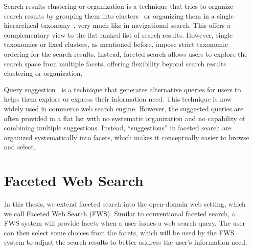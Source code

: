 Search results clustering or organization is a technique that tries to organize search results by grouping them into clusters~\cite{carpineto2009survey} or organizing them in a single hierarchical taxonomy~\cite{lawrie2001finding,lawrie2003generating, nevill1999lexically}, very much like in navigational search. This offers a complementary view to the flat ranked list of search results. However, single taxonomies or fixed clusters, as mentioned before, impose strict taxonomic ordering for the search results. Instead, faceted search allows users to explore the search space from multiple facets, offering flexibility beyond search results clustering or organization.

Query suggestion~\cite{baeza2004query, cao2008context} is a technique that generates alternative queries for users to helps them explore or express their information need. This technique is now widely used in commerce web search engine. However, the suggested queries are often provided in a flat list with no systematic organization and no capability of combining multiple suggestions. Instead, ``suggestions'' in faceted search are organized systematically into facets, which makes it conceptually easier to browse and select.

\section{Faceted Web Search}
\label{sec:intro-fws}
In this thesis, we extend faceted search into the open-domain web setting, which we call Faceted Web Search (FWS). Similar to conventional faceted search, a FWS system will provide facets when a user issues a web search query. The user can then select some choices from the facets, which will be used by the FWS system to adjust the search results to better address the user's information need.

